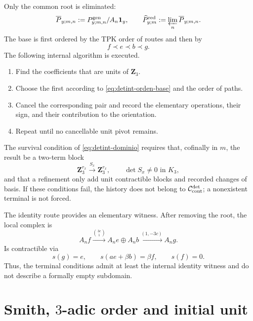 Only the common root is eliminated:
\begin{equation}\label{eq:detint-p-reducido}
 \overline P_{y;m,n}
 :=P^{\rm gen}_{y;m,n}/A_n\mathbf1_y,
 \qquad
 \widehat P_{y;m}^{\rm red}:=\varprojlim_n\overline P_{y;m,n}.
\end{equation}
The base is first ordered by the TPK order of routes and then by
\begin{equation}\label{eq:detint-orden-base}
 f\prec e\prec b\prec g.
\end{equation}
The following internal algorithm is executed.
\begin{enumerate}
 \item Find the coefficients that are units of \(\mathbf Z_3\).
 \item Choose the first according to \eqref{eq:detint-orden-base} and the order of
 paths.
 \item Cancel the corresponding pair and record the elementary
 operations, their sign, and their contribution to the orientation.
 \item Repeat until no cancellable unit pivot remains.
\end{enumerate}
The survival condition of \eqref{eq:detint-dominio} requires that,
cofinally in \(m\), the result be a two-term block
\begin{equation}\label{eq:detint-sx}
 \mathbf Z_3^{r_x}\xrightarrow{S_x}\mathbf Z_3^{r_x},
 \qquad
 \det S_x\ne0\text{ in }K_3,
\end{equation}
and that a refinement only add unit contractible blocks and recorded
changes of basis. If these conditions fail, the history does not belong to
\(\mathcal C_{\rm cont}^{\rm det}\); a nonexistent terminal is not forced.

The identity route provides an elementary witness. After removing the root,
the local complex is
\begin{equation}\label{eq:detint-testigo-contractil}
 A_nf\xrightarrow{\binom{3c}{1}}
 A_ne\oplus A_nb\xrightarrow{(1,-3c)}A_ng.
\end{equation}
Is contractible via
\begin{equation}\label{eq:detint-contraccion-local}
 s(g)=e,
 \qquad
 s(ae+\beta b)=\beta f,
 \qquad
 s(f)=0.
\end{equation}
Thus, the terminal conditions admit at least the internal identity witness
and do not describe a formally empty subdomain.

\section{Smith, \texorpdfstring{\(3\)}{3}-adic order and initial unit}

